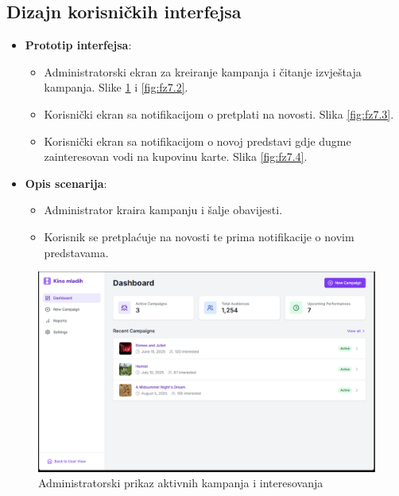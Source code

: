 \subsection{Dizajn korisničkih interfejsa}  
\begin{itemize}  
    \item \textbf{Prototip interfejsa}: 
    \begin{itemize}
        \item Administratorski ekran za kreiranje kampanja i čitanje izvještaja kampanja. Slike \ref{fig:fz7.1} i \ref{fig:fz7.2}.
        \item Korisnički ekran sa notifikacijom o pretplati na novosti. Slika \ref{fig:fz7.3}.
        \item Korisnički ekran sa notifikacijom o novoj predstavi gdje dugme zainteresovan vodi na kupovinu karte. Slika \ref{fig:fz7.4}.
    \end{itemize}
    \item \textbf{Opis scenarija}:  
        \begin{itemize}  
            \item Administrator kraira kampanju i šalje obavijesti.  
            \item Korisnik se pretplaćuje na novosti te prima notifikacije o novim predstavama.  
        \end{itemize}  
\end{itemize}  
\begin{figure}[H]
        \centering
        \includegraphics[width=1\linewidth]{Slike/FZ7.1.PNG}
        \caption{Administratorski prikaz aktivnih kampanja i interesovanja}
        \label{fig:fz7.1}
    \end{figure} 
